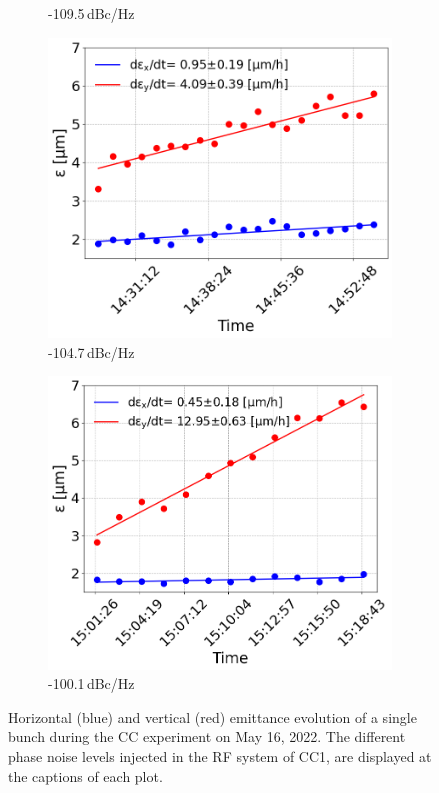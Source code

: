\begin{figure}[htp]
\begin{subfigure}{.45\textwidth}
       \caption{-109.5\,dBc/Hz}
       \label{fig:cc_md_2022_coast3}
   \end{subfigure}
   \begin{subfigure}{.45\textwidth}
       \centering
       \includegraphics[width=.95\linewidth]{images/Ch8/emit_vs_time_Set1_coast4.png}  
       \caption{-104.7\,dBc/Hz}
       \label{fig:cc_md_2022_coast4}
   \end{subfigure}
   \begin{subfigure}{.45\textwidth}
           \centering
           \includegraphics[width=.95\linewidth]{images/Ch8/emit_vs_time_Set1_coast5.png}  
           \caption{-100.1\,dBc/Hz}
           \label{fig:cc_md_2022_coast5}
   \end{subfigure}
   \caption{Horizontal (blue) and vertical (red) emittance evolution of a single bunch during the CC experiment on May 16, 2022. The different phase noise levels injected in the RF system of CC1, are displayed at the captions of each plot.}
   \label{fig:cc_md_2022_overview_plots_noise_scan}
\end{figure}

